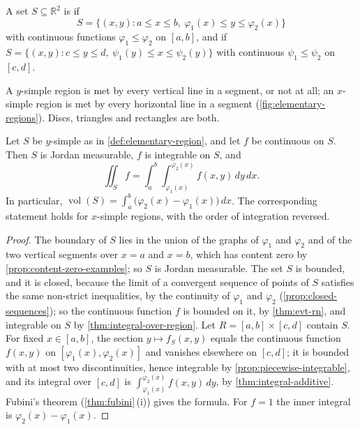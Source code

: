\begin{definition}
\label{def:elementary-region}
A set $S\subseteq\mathbb R^2$ is  if
\[
S=\{(x,y): a\le x\le b,\ \varphi_1(x)\le y\le\varphi_2(x)\}
\]
with continuous functions $\varphi_1\le\varphi_2$ on $[a,b]$, and  if $S=\{(x,y): c\le y\le d,\ \psi_1(y)\le x\le\psi_2(y)\}$ with continuous $\psi_1\le\psi_2$ on $[c,d]$.
\end{definition}

A $y$-simple region is met by every vertical line in a segment, or not at all; an $x$-simple region is met by every horizontal line in a segment (\cref{fig:elementary-regions}). Discs, triangles and rectangles are both.

\begin{theorem}
\label{thm:elementary-regions}
Let $S$ be $y$-simple as in \cref{def:elementary-region}, and let $f$ be continuous on $S$. Then $S$ is Jordan measurable, $f$ is integrable on $S$, and
\[
\iint_Sf=\int_a^b\int_{\varphi_1(x)}^{\varphi_2(x)}f(x,y)\,dy\,dx .
\]
In particular, $\operatorname{vol}(S)=\int_a^b\bigl(\varphi_2(x)-\varphi_1(x)\bigr)\,dx$. The corresponding statement holds for $x$-simple regions, with the order of integration reversed.
\end{theorem}

\begin{proof}
The boundary of $S$ lies in the union of the graphs of $\varphi_1$ and $\varphi_2$ and of the two vertical segments over $x=a$ and $x=b$, which has content zero by \cref{prop:content-zero-examples}; so $S$ is Jordan measurable. The set $S$ is bounded, and it is closed, because the limit of a convergent sequence of points of $S$ satisfies the same non-strict inequalities, by the continuity of $\varphi_1$ and $\varphi_2$ (\cref{prop:closed-sequences}); so the continuous function $f$ is bounded on it, by \cref{thm:evt-rn}, and integrable on $S$ by \cref{thm:integral-over-region}. Let $R=[a,b]\times[c,d]$ contain $S$. For fixed $x\in[a,b]$, the section $y\mapsto f_S(x,y)$ equals the continuous function $f(x,y)$ on $[\varphi_1(x),\varphi_2(x)]$ and vanishes elsewhere on $[c,d]$; it is bounded with at most two discontinuities, hence integrable by \cref{prop:piecewise-integrable}, and its integral over $[c,d]$ is $\int_{\varphi_1(x)}^{\varphi_2(x)}f(x,y)\,dy$, by \cref{thm:integral-additive}. Fubini's theorem (\cref{thm:fubini}\,(i)) gives the formula. For $f=1$ the inner integral is $\varphi_2(x)-\varphi_1(x)$.
\end{proof}

